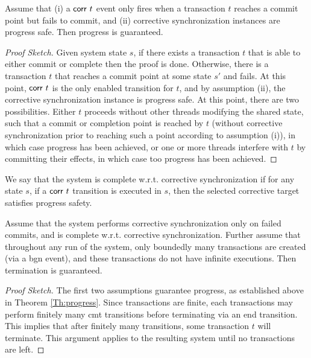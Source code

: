 \begin{theorem}[Progress]\label{Th:progress} Assume that (i) a ${\sf corr}\ t$ event only fires when a transaction $t$ reaches a commit point but fails to commit, and (ii) corrective synchronization instances are progress safe. Then progress is guaranteed.
	\begin{proof}[Proof Sketch]
	Given system state $s$, if there exists a transaction $t$ that is able to either commit or complete then the proof is done. Otherwise, there is a transaction $t$ that reaches a commit point at some state $s'$ and fails. At this point, ${\sf corr}\ t$ is the only enabled transition for $t$, and by assumption (ii), the corrective synchronization instance is progress safe. At this point, there are two possibilities. Either $t$ proceeds without other threads modifying the shared state, such that a commit or completion point is reached by $t$ (without corrective synchronization prior to reaching such a point according to assumption (i)), in which case progress has been achieved, or one or more threads interfere with $t$ by committing their effects, in which case too progress has been achieved.
	\end{proof}
\end{theorem}

\begin{definition} 
	We say that the system is complete w.r.t. corrective synchronization if for any state $s$, if a ${\sf corr}\ t$ transition is executed in $s$, then the selected corrective target satisfies progress safety.
\end{definition}

\begin{lemma}[Termination]
	Assume that the system performs corrective synchronization only on failed commits, and is complete w.r.t. corrective synchronization. Further assume that throughout any run of the system, only boundedly many transactions are created (via a {\sf bgn} event), and these transactions do not have infinite executions. Then termination is guaranteed. \vspace{3pt}
	\begin{proof}[Proof Sketch]
		The first two assumptions guarantee progress, as established above in 
		Theorem \ref{Th:progress}. Since transactions are finite, each transactions may perform finitely many {\sf cmt} transitions before terminating via an {\sf end} transition. This implies that after finitely many transitions, some transaction $t$ will terminate. This argument applies to the resulting system until no transactions are left.
	\end{proof}
\end{lemma}

